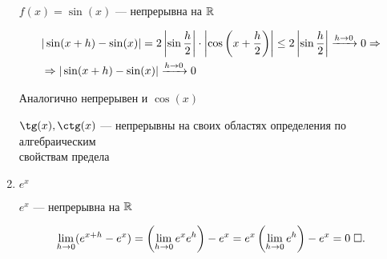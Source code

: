 \documentclass{article}
\begin{document}
\begin{enumerate}
	\theorem

	$f(x)=\sin(x)$ ---  непрерывна на $\mathbb{R}$

	\proof
	\begin{align*}
		 & |\sin(x+h)-\sin(x)|=2\left|\sin\frac{h}{2}\right|\cdot\left|\cos\left(x+\frac{h}{2}\right)\right|\leq 2\left|\sin\frac{h}{2}\right|\xrightarrow{h\to 0} 0\Rightarrow \\
		 & \Rightarrow|\sin(x+h)-\sin(x)|\xrightarrow{h\to 0} 0
	\end{align*}

	\pagebreak

	Аналогично непрерывен и $\cos(x)$

	$\tg(x), \ctg(x)$ --- непрерывны на своих областях определения по алгебраическим\\
	свойствам предела

	\item{}$e^{x}$

	\theorem

	$e^{x}$ --- непрерывна на $\mathbb{R}$

	\proof
	\begin{align*}
		\lim\limits_{h\to 0}(e^{x+h}-e^{x})=\left(\lim\limits_{h\to 0}e^{x}e^{h}\right)-e^{x}=e^{x}\left(\lim\limits_{h\to 0}e^{h}\right)-e^{x}=0\;\square.
	\end{align*}

\end{enumerate}
\end{document}
